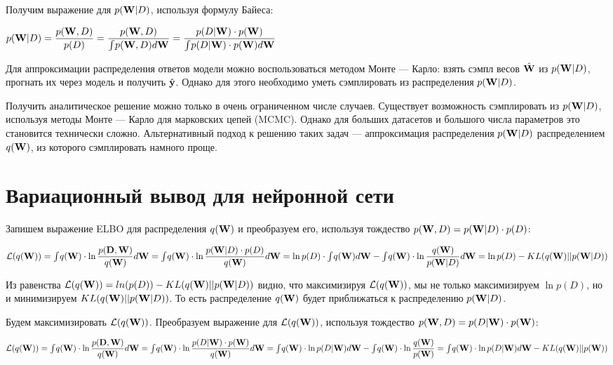 \documentclass{article}
\begin{document}
Получим выражение для $p(\bold{W}| D)$, используя формулу Байеса:

$p(\bold{W}| D) =
\dfrac{p(\bold{W}, D)}{p(D)} =
\dfrac{p(\bold{W}, D)}{\int_{}{} p(\bold{W}, D) d\bold{W}} =
\dfrac{p(D | \bold{W}) \cdot p(\bold{W})}{\int_{}{} p(D | \bold{W}) \cdot p(\bold{W}) d\bold{W}} $

Для аппроксимации распределения ответов модели можно воспользоваться методом Монте — Карло: взять сэмпл весов $\hat{\bold{W}}$ из $p(\bold{W}| D)$, прогнать их через модель и получить $\hat{\bold{y}}$. Однако для этого необходимо уметь сэмплировать из распределения $p(\bold{W}| D)$.

Получить аналитическое решение можно только в очень ограниченном числе случаев. Существует возможность сэмплировать из $p(\bold{W}| D)$, используя методы Монте — Карло для марковских цепей (MCMC). Однако для больших датасетов и большого числа параметров это становится технически сложно. Альтернативный подход к решению таких задач — аппроксимация распределения $p(\bold{W}| D)$ распределением $q(\bold{W})$, из которого сэмплировать намного проще.


\section{Вариационный вывод для нейронной сети}
Запишем выражение ELBO для распределения $q(\bold{W})$ и преобразуем его, используя тождество $p(\bold{W}, D) = p(\bold{W}| D)\cdot p(D)$:

$
\mathcal{L}(q(\bold{W})) =
\int_{}{} q(\bold{W}) \cdot \ln{\dfrac{p(\bold{D}, \bold{W})}{q(\bold{W})}} d\bold{W} =
\int_{}{} q(\bold{W}) \cdot \ln{\dfrac{p(\bold{W}| D) \cdot p(D)}{q(\bold{W})}} d\bold{W} = 
\ln{p(D)} \cdot \int_{}{} q(\bold{W}) d\bold{W} - \int_{}{} q(\bold{W})\cdot \ln{\dfrac{q(\bold{W})}{p(\bold{W}| D)}} d\bold{W} =
\ln{p(D)} - KL(q(\bold{W}) || p(\bold{W}| D))
$

Из равенства $\mathcal{L}(q(\bold{W})) = ln(p(D)) - KL(q(\bold{W}) || p(\bold{W}| D))$ видно, что максимизируя $\mathcal{L}(q(\bold{W}))$, мы не только максимизируем $\ln {p(D)}$, но и минимизируем $KL(q(\bold{W}) || p(\bold{W}| D))$. То есть распределение $q(\bold{W})$ будет приближаться к распределению $p(\bold{W}| D)$.

Будем максимизировать $\mathcal{L}(q(\bold{W}))$. Преобразуем выражение для $\mathcal{L}(q(\bold{W}))$, используя тождество
$p(\bold{W}, D) = p(D | \bold{W}) \cdot p(\bold{W})$:

$
\mathcal{L}(q(\bold{W})) =
\int_{}{} q(\bold{W}) \cdot \ln{\dfrac{p(\bold{D}, \bold{W})}{q(\bold{W})}} d\bold{W} =
\int_{}{} q(\bold{W}) \cdot \ln{\dfrac{p(D | \bold{W}) \cdot p(\bold{W})}{q(\bold{W})}} d\bold{W} = 
\int_{}{} q(\bold{W}) \cdot \ln{p(D | \bold{W})} d\bold{W} - \int_{}{} q(\bold{W}) \cdot \ln{\dfrac{q(\bold{W})}{p(\bold{W})}} = 
\int_{}{} q(\bold{W}) \cdot \ln{p(D | \bold{W})} d\bold{W} - KL(q(\bold{W}) || p(\bold{W}))
$
\end{document}
